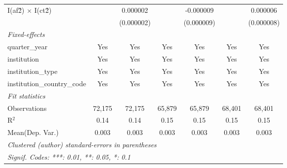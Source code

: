 \begin{tabular}{lcccccc}
   I(af\^2) $\times$ I(ct\^2)         &                 & 0.000002       &                 & -0.000009      &                & 0.000006\\   
                                      &                 & (0.000002)     &                 & (0.000009)     &                & (0.000008)\\   
   \midrule
   \emph{Fixed-effects}\\
   quarter\_year                      & Yes             & Yes            & Yes             & Yes            & Yes            & Yes\\  
   institution                        & Yes             & Yes            & Yes             & Yes            & Yes            & Yes\\  
   institution\_type                  & Yes             & Yes            & Yes             & Yes            & Yes            & Yes\\  
   institution\_country\_code         & Yes             & Yes            & Yes             & Yes            & Yes            & Yes\\  
   \midrule
   \emph{Fit statistics}\\
   Observations                       & 72,175          & 72,175         & 65,879          & 65,879         & 68,401         & 68,401\\  
   R$^2$                              & 0.14            & 0.14           & 0.15            & 0.15           & 0.15           & 0.15\\  
Mean(Dep. Var.) & 0.003 & 0.003 & 0.003 & 0.003 & 0.003 & 0.003 \\
   \midrule \midrule
   \multicolumn{7}{l}{\emph{Clustered (author) standard-errors in parentheses}}\\
   \multicolumn{7}{l}{\emph{Signif. Codes: ***: 0.01, **: 0.05, *: 0.1}}\\
\end{tabular}
\par\endgroup
